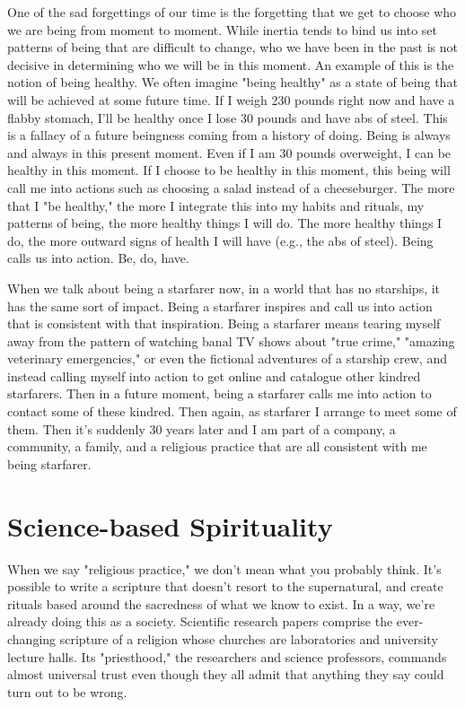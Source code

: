 \documentclass[ebook,11pt,openany,twoside]{memoir}
\begin{document}
One of the sad forgettings of our time is the forgetting that we get to choose
who we are being from moment to moment. While inertia tends to bind us into set
patterns of being that are difficult to change, who we have been in the past is
not decisive in determining who we will be in this moment. An example of this
is the notion of being healthy. We often imagine "being healthy" as a state of
being that will be achieved at some future time. If I weigh 230 pounds right
now and have a flabby stomach, I'll be healthy once I lose 30 pounds and have
abs of steel. This is a fallacy of a future beingness coming from a history of
doing. Being is always and always in this present moment. Even if I am 30
pounds overweight, I can be healthy in this moment. If I choose to be healthy
in this moment, this being will call me into actions such as choosing a salad
instead of a cheeseburger. The more that I "be healthy," the more I integrate
this into my habits and rituals, my patterns of being, the more healthy things
I will do. The more healthy things I do, the more outward signs of health I
will have (e.g., the abs of steel). Being calls us into action. Be, do, have.

When we talk about being a starfarer now, in a world that has no starships, it
has the same sort of impact. Being a starfarer inspires and call us into action
that is consistent with that inspiration. Being a starfarer means tearing
myself away from the pattern of watching banal TV shows about "true crime,"
"amazing veterinary emergencies," or even the fictional adventures of a
starship crew, and instead calling myself into action to get online and
catalogue other kindred starfarers. Then in a future moment, being a starfarer
calls me into action to contact some of these kindred. Then again, as starfarer
I arrange to meet some of them. Then it's suddenly 30 years later and I am part
of a company, a community, a family, and a religious practice that are all
consistent with me being starfarer.

\chapter{Science-based Spirituality}

When we say "religious practice," we don't mean what you probably think. It's
possible to write a scripture that doesn't resort to the supernatural, and
create rituals based around the sacredness of what we know to exist. In a way,
we're already doing this as a society. Scientific research papers comprise the
ever-changing scripture of a religion whose churches are laboratories and
university lecture halls. Its "priesthood," the researchers and science
professors, commands almost universal trust even though they all admit that
anything they say could turn out to be wrong.
\end{document}
